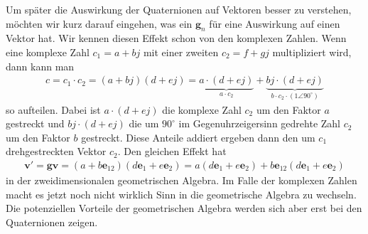 Um später die Auswirkung der Quaternionen auf Vektoren besser zu verstehen, möchten wir kurz darauf eingehen, was ein  $\mathbf{g}_n$ für eine Auswirkung auf einen Vektor hat.
Wir kennen diesen Effekt schon von den komplexen Zahlen. Wenn eine komplexe Zahl $c_1=a+bj$ mit einer zweiten $c_2=f+gj$ multipliziert wird, dann kann man
\begin{align*}
c = c_1\cdot c_2 = (a + bj)(d + ej) = \underbrace{a\cdot(d+ej)}_{\displaystyle{a\cdot c_2}} + \underbrace{bj\cdot(d+ej)}_{\displaystyle{b\cdot c_2 \cdot (1\angle 90^\circ)}}
\end{align*}
so aufteilen.
Dabei ist $a\cdot(d+ej)$ die komplexe Zahl $c_2$ um den Faktor $a$ gestreckt und $bj\cdot(d+ej)$
die um $90^\circ$ im Gegenuhrzeigersinn gedrehte Zahl $c_2$ um den Faktor $b$ gestreckt.
Diese Anteile addiert ergeben dann den um $c_1$ drehgestreckten Vektor $c_2$. Den gleichen Effekt hat
\begin{align}\label{GAdrehstreck}
\mathbf{v}' = \mathbf{g}\mathbf{v} = (a + b\mathbf{e}_{12})(d\mathbf{e}_{1} + e\mathbf{e}_{2}) = a(d\mathbf{e}_{1} + e\mathbf{e}_{2}) + b\mathbf{e}_{12}(d\mathbf{e}_{1} + e\mathbf{e}_{2})
\end{align}
in der zweidimensionalen geometrischen Algebra.
Im Falle der komplexen Zahlen macht es jetzt noch nicht wirklich Sinn in die geometrische Algebra zu wechseln.
Die potenziellen Vorteile der geometrischen Algebra werden sich aber erst bei den Quaternionen zeigen.
